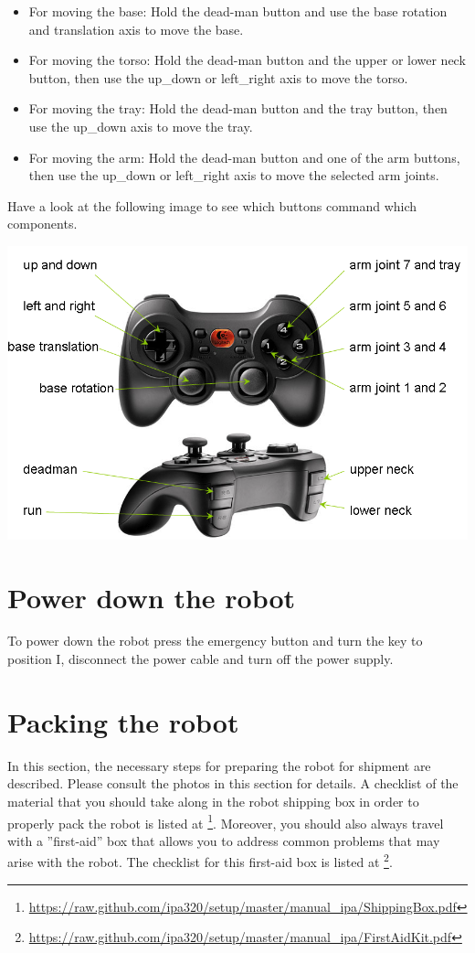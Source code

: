 \begin{itemize}
\item For moving the base: Hold the dead-man button and use the base rotation and translation axis to move the base.
\item For moving the torso: Hold the dead-man button and the upper or lower neck button, then use the up\_down or left\_right axis to move the torso.
\item For moving the tray: Hold the dead-man button and the tray button, then use the up\_down axis to move the tray.
\item For moving the arm: Hold the dead-man button and one of the arm buttons, then use the up\_down or left\_right axis to move the selected arm joints.
\end{itemize}

Have a look at the following image to see which buttons command which components. 
\begin{center}
\includegraphics[width=1\textwidth]{images/joystick.png}
\end{center}

\section{Power down the robot}
To power down the robot press the emergency button and turn the key to position I, disconnect the power cable and turn off the power supply.

\section{Packing the robot}
In this section, the necessary steps for preparing the robot for shipment are described. Please consult the photos in this section for details.
A checklist of the material that you should take along in the robot shipping box in order to properly pack the robot is listed at \footnote{\url{https://raw.github.com/ipa320/setup/master/manual_ipa/ShippingBox.pdf}}.
Moreover, you should also always travel with a ''first-aid'' box that allows you to address common problems that may arise with the robot. The checklist for this first-aid box is listed at \footnote{\url{https://raw.github.com/ipa320/setup/master/manual_ipa/FirstAidKit.pdf}}.

